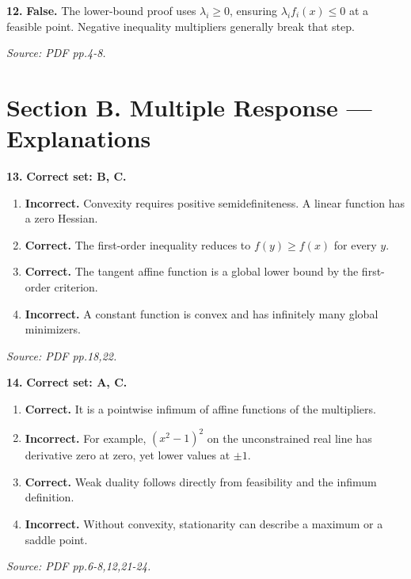 \documentclass[11pt,a4paper]{article}
\begin{document}
\par\noindent\begin{minipage}{\linewidth}
\textbf{12.} \textbf{False.} The lower-bound proof uses \(\lambda_i\ge0\), ensuring \(\lambda_if_i(x)\le0\) at a feasible point. Negative inequality multipliers generally break that step.

{\footnotesize\textit{Source: PDF pp.4-8.}}
\end{minipage}\par\vspace{3mm}
\newpage\section*{Section B. Multiple Response --- Explanations}
\par\noindent\begin{minipage}{\linewidth}
\textbf{13.} \textbf{Correct set: B, C.}
\begin{enumerate}[label=(\Alph*),leftmargin=8mm,itemsep=2pt,topsep=2pt]
\item \textbf{Incorrect.} Convexity requires positive semidefiniteness. A linear function has a zero Hessian.
\item \textbf{Correct.} The first-order inequality reduces to \(f(y)\ge f(x)\) for every \(y\).
\item \textbf{Correct.} The tangent affine function is a global lower bound by the first-order criterion.
\item \textbf{Incorrect.} A constant function is convex and has infinitely many global minimizers.
\end{enumerate}
{\footnotesize\textit{Source: PDF pp.18,22.}}

\end{minipage}\par\vspace{3mm}
\par\noindent\begin{minipage}{\linewidth}
\textbf{14.} \textbf{Correct set: A, C.}
\begin{enumerate}[label=(\Alph*),leftmargin=8mm,itemsep=2pt,topsep=2pt]
\item \textbf{Correct.} It is a pointwise infimum of affine functions of the multipliers.
\item \textbf{Incorrect.} For example, \((x^2-1)^2\) on the unconstrained real line has derivative zero at zero, yet lower values at \(\pm1\).
\item \textbf{Correct.} Weak duality follows directly from feasibility and the infimum definition.
\item \textbf{Incorrect.} Without convexity, stationarity can describe a maximum or a saddle point.
\end{enumerate}
{\footnotesize\textit{Source: PDF pp.6-8,12,21-24.}}

\end{minipage}\par\vspace{3mm}
\end{document}
